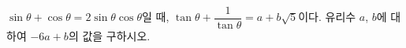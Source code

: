 $\sin\theta+\cos\theta=2\sin\theta\cos\theta$일 때, $\tan\theta+\dfrac{1}{\tan\theta}=a+b\sqrt{5}$이다. 유리수 $a$, $b$에 대하여 $-6a+b$의 값을 구하시오. 
